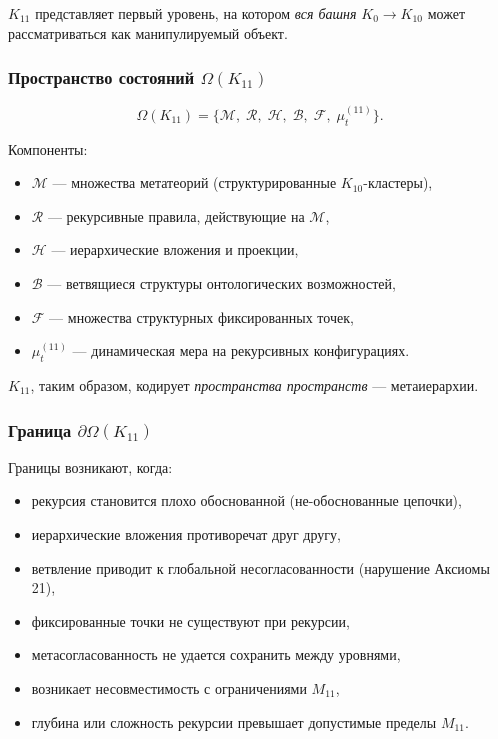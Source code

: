 $K_{11}$ представляет первый уровень, на котором \emph{вся башня} $K_0 \to K_{10}$
может рассматриваться как манипулируемый объект.

\subsubsection{Пространство состояний $\Omega(K_{11})$}

\[
\Omega(K_{11})=
\{
\mathcal{M},\;
\mathcal{R},\;
\mathcal{H},\;
\mathcal{B},\;
\mathcal{F},\;
\mu^{(11)}_t
\}.
\]

Компоненты:
\begin{itemize}
    \item $\mathcal{M}$ — множества метатеорий (структурированные $K_{10}$-кластеры),
    \item $\mathcal{R}$ — рекурсивные правила, действующие на $\mathcal{M}$,
    \item $\mathcal{H}$ — иерархические вложения и проекции,
    \item $\mathcal{B}$ — ветвящиеся структуры онтологических возможностей,
    \item $\mathcal{F}$ — множества структурных фиксированных точек,
    \item $\mu^{(11)}_t$ — динамическая мера на рекурсивных конфигурациях.
\end{itemize}

$K_{11}$, таким образом, кодирует \emph{пространства пространств} — метаиерархии.

\subsubsection{Граница $\partial\Omega(K_{11})$}

Границы возникают, когда:
\begin{itemize}
    \item рекурсия становится плохо обоснованной (не-обоснованные цепочки),
    \item иерархические вложения противоречат друг другу,
    \item ветвление приводит к глобальной несогласованности (нарушение Аксиомы 21),
    \item фиксированные точки не существуют при рекурсии,
    \item метасогласованность не удается сохранить между уровнями,
    \item возникает несовместимость с ограничениями $M_{11}$,
    \item глубина или сложность рекурсии превышает допустимые пределы $M_{11}$.
\end{itemize}


